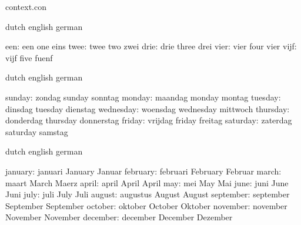 


\startlogginginterface context.con



\startvariables       dutch                english             german

                een:  een                  one                 eins
               twee:  twee                 two                 zwei
               drie:  drie                 three               drei
               vier:  vier                 four                vier
               vijf:  vijf                 five                fuenf

\stopvariables




\startvariables  dutch       english     german

        sunday:  zondag      sunday      sonntag
        monday:  maandag     monday      montag
       tuesday:  dinsdag     tuesday     dienstag
     wednesday:  woensdag    wednesday   mittwoch
      thursday:  donderdag   thursday    donnerstag
        friday:  vrijdag     friday      freitag
      saturday:  zaterdag    saturday    samstag

\stopvariables

\startvariables  dutch       english     german

       january:  januari     January     Januar
      february:  februari    February    Februar
         march:  maart       March       Maerz
         april:  april       April       April
           may:  mei         May         Mai
          june:  juni        June        Juni
          july:  juli        July        Juli
        august:  augustus    August      August
     september:  september   September   September
       october:  oktober     October     Oktober
      november:  november    November    November
      december:  december    December    Dezember

